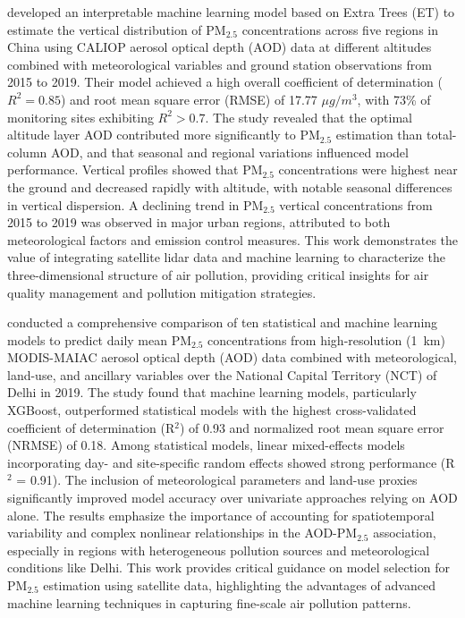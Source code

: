 \documentclass[11pt]{article}
\begin{document}
\citet{chen2022obtaining} developed an interpretable machine learning model based on Extra Trees (ET) to estimate the vertical distribution of PM$_{2.5}$ concentrations across five regions in China using CALIOP aerosol optical depth (AOD) data at different altitudes combined with meteorological variables and ground station observations from 2015 to 2019. Their model achieved a high overall coefficient of determination (\( R^{2} = 0.85 \)) and root mean square error (RMSE) of 17.77 \(\mu g/m^{3}\), with 73\% of monitoring sites exhibiting \( R^{2} > 0.7 \). The study revealed that the optimal altitude layer AOD contributed more significantly to PM$_{2.5}$ estimation than total-column AOD, and that seasonal and regional variations influenced model performance. Vertical profiles showed that PM$_{2.5}$ concentrations were highest near the ground and decreased rapidly with altitude, with notable seasonal differences in vertical dispersion. A declining trend in PM$_{2.5}$ vertical concentrations from 2015 to 2019 was observed in major urban regions, attributed to both meteorological factors and emission control measures. This work demonstrates the value of integrating satellite lidar data and machine learning to characterize the three-dimensional structure of air pollution, providing critical insights for air quality management and pollution mitigation strategies.

\citet{kulkarni2022model} conducted a comprehensive comparison of ten statistical and machine learning models to predict daily mean PM$_{2.5}$ concentrations from high-resolution (1~km) MODIS-MAIAC aerosol optical depth (AOD) data combined with meteorological, land-use, and ancillary variables over the National Capital Territory (NCT) of Delhi in 2019. The study found that machine learning models, particularly XGBoost, outperformed statistical models with the highest cross-validated coefficient of determination (R$^2$) of 0.93 and normalized root mean square error (NRMSE) of 0.18. Among statistical models, linear mixed-effects models incorporating day- and site-specific random effects showed strong performance (R$^2$ = 0.91). The inclusion of meteorological parameters and land-use proxies significantly improved model accuracy over univariate approaches relying on AOD alone. The results emphasize the importance of accounting for spatiotemporal variability and complex nonlinear relationships in the AOD-PM$_{2.5}$ association, especially in regions with heterogeneous pollution sources and meteorological conditions like Delhi. This work provides critical guidance on model selection for PM$_{2.5}$ estimation using satellite data, highlighting the advantages of advanced machine learning techniques in capturing fine-scale air pollution patterns.
\end{document}
